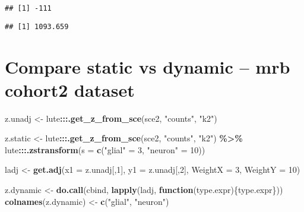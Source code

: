 \documentclass[
]{article}
\newenvironment{Shaded}{\begin{snugshade}}{\end{snugshade}}
\newcommand{\AttributeTok}[1]{\textcolor[rgb]{0.13,0.29,0.53}{#1}}
\newcommand{\CommentTok}[1]{\textcolor[rgb]{0.56,0.35,0.01}{\textit{#1}}}
\newcommand{\ControlFlowTok}[1]{\textcolor[rgb]{0.13,0.29,0.53}{\textbf{#1}}}
\newcommand{\DecValTok}[1]{\textcolor[rgb]{0.00,0.00,0.81}{#1}}
\newcommand{\FunctionTok}[1]{\textcolor[rgb]{0.13,0.29,0.53}{\textbf{#1}}}
\newcommand{\NormalTok}[1]{#1}
\newcommand{\OtherTok}[1]{\textcolor[rgb]{0.56,0.35,0.01}{#1}}
\newcommand{\SpecialCharTok}[1]{\textcolor[rgb]{0.81,0.36,0.00}{\textbf{#1}}}
\newcommand{\StringTok}[1]{\textcolor[rgb]{0.31,0.60,0.02}{#1}}
\begin{document}
\begin{verbatim}
## [1] -111
\end{verbatim}

\begin{Shaded}
\end{Shaded}

\begin{verbatim}
## [1] 1093.659
\end{verbatim}

\hypertarget{compare-static-vs-dynamic-mrb-cohort2-dataset}{%
\section{Compare static vs dynamic -- mrb cohort2
dataset}\label{compare-static-vs-dynamic-mrb-cohort2-dataset}}

\begin{Shaded}
\begin{Highlighting}[]
\NormalTok{z.unadj }\OtherTok{\textless{}{-}}\NormalTok{ lute}\SpecialCharTok{:::}\FunctionTok{.get\_z\_from\_sce}\NormalTok{(sce2, }\StringTok{"counts"}\NormalTok{, }\StringTok{"k2"}\NormalTok{)}

\NormalTok{z.static }\OtherTok{\textless{}{-}}\NormalTok{ lute}\SpecialCharTok{:::}\FunctionTok{.get\_z\_from\_sce}\NormalTok{(sce2, }\StringTok{"counts"}\NormalTok{, }\StringTok{"k2"}\NormalTok{) }\SpecialCharTok{\%\textgreater{}\%}
\NormalTok{  lute}\SpecialCharTok{:::}\FunctionTok{.zstransform}\NormalTok{(}\AttributeTok{s =} \FunctionTok{c}\NormalTok{(}\StringTok{"glial"} \OtherTok{=} \DecValTok{3}\NormalTok{, }\StringTok{"neuron"} \OtherTok{=} \DecValTok{10}\NormalTok{))}

\NormalTok{ladj }\OtherTok{\textless{}{-}} \FunctionTok{get.adj}\NormalTok{(}\AttributeTok{x1 =}\NormalTok{ z.unadj[,}\DecValTok{1}\NormalTok{], }\AttributeTok{y1 =}\NormalTok{ z.unadj[,}\DecValTok{2}\NormalTok{], }\AttributeTok{WeightX =} \DecValTok{3}\NormalTok{, }\AttributeTok{WeightY =} \DecValTok{10}\NormalTok{)}

\NormalTok{z.dynamic }\OtherTok{\textless{}{-}} \FunctionTok{do.call}\NormalTok{(cbind, }\FunctionTok{lapply}\NormalTok{(ladj, }\ControlFlowTok{function}\NormalTok{(type.expr)\{type.expr\}))}
\FunctionTok{colnames}\NormalTok{(z.dynamic) }\OtherTok{\textless{}{-}} \FunctionTok{c}\NormalTok{(}\StringTok{"glial"}\NormalTok{, }\StringTok{"neuron"}\NormalTok{)}
\end{Highlighting}
\end{Shaded}
\end{document}
